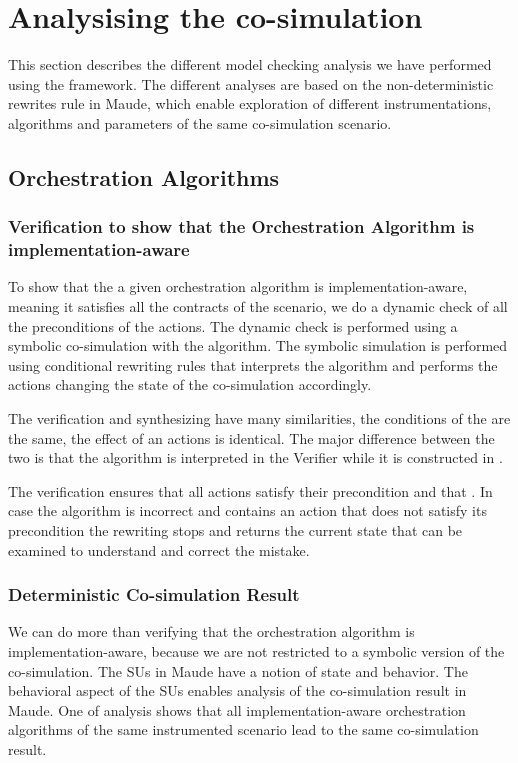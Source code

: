 \section{Analysising the co-simulation}
This section describes the different model checking analysis we have performed using the framework.
The different analyses are based on the non-deterministic rewrites rule in Maude, which enable exploration of different instrumentations, algorithms and parameters of the same co-simulation scenario.

\subsection{Orchestration Algorithms}

\subsubsection{Verification to show that the Orchestration Algorithm is implementation-aware}
To show that the a given orchestration algorithm is implementation-aware, meaning it satisfies all the contracts of the scenario, we do a dynamic check of all the preconditions of the actions.
The dynamic check is performed using a symbolic co-simulation with the algorithm. 
The symbolic simulation is performed using conditional rewriting rules that interprets the algorithm and performs the actions changing the state of the co-simulation accordingly. 



The verification and synthesizing have many similarities, the conditions of the are the same, the effect of an actions is identical.
The major difference between the two is that the algorithm is interpreted in the Verifier while it is constructed in .

The verification ensures that all actions satisfy their precondition and that .
In case the algorithm is incorrect and contains an action that does not satisfy its precondition the rewriting stops and returns the current state that can be examined to understand and correct the mistake.

\subsubsection{Deterministic Co-simulation Result}
We can do more than verifying that the orchestration algorithm is implementation-aware, because we are not restricted to a symbolic version of the co-simulation.
The SUs in Maude have a notion of state and behavior. 
The behavioral aspect of the SUs enables analysis of the co-simulation result in Maude.
One of analysis shows that all implementation-aware orchestration algorithms of the same instrumented scenario lead to the same co-simulation result. 

